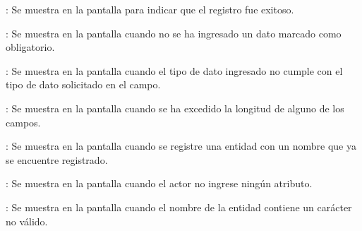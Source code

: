 \begin{Citemize}
	\item {}: Se muestra en la pantalla  para indicar que el registro fue exitoso.
	\item {}: Se muestra en la pantalla  cuando no se ha ingresado un dato marcado como obligatorio.
	\item {}: Se muestra en la pantalla  cuando el tipo de dato ingresado no cumple con el tipo de dato solicitado en el campo.
	\item {}: Se muestra en la pantalla  cuando se ha excedido la longitud de alguno de los campos.
	\item {}: Se muestra en la pantalla  cuando se registre una entidad con un nombre que ya se encuentre registrado.
	\item {}: Se muestra en la pantalla  cuando el actor no ingrese ningún atributo.
	\item {}: Se muestra en la pantalla  cuando el nombre de la entidad contiene un carácter no válido.
\end{Citemize}
